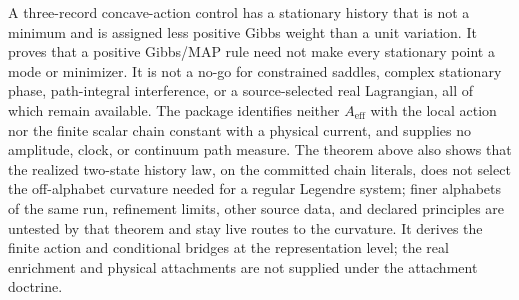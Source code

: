 \documentclass[11pt]{article}
\begin{document}
A three-record concave-action control has a stationary history that is not a
minimum and is assigned less positive Gibbs weight than a unit variation.
It proves that a positive Gibbs/MAP rule need not make every stationary point
a mode or minimizer.  It is not a no-go for constrained saddles, complex
stationary phase, path-integral interference, or a source-selected real
Lagrangian, all of which remain available.  The package identifies neither \(A_{\mathrm{eff}}\) with the local action nor
the finite scalar chain constant with a physical current, and supplies no
amplitude, clock, or continuum path measure. The theorem above
also shows that the realized two-state history law, on the committed
chain literals, does not select the off-alphabet curvature
needed for a regular Legendre system; finer alphabets of the same run,
refinement limits, other source data, and declared principles are
untested by that theorem and stay live routes to the curvature. It derives the finite action and
conditional bridges at the representation level; the real enrichment and
physical attachments are not supplied under the attachment doctrine.
\end{document}
